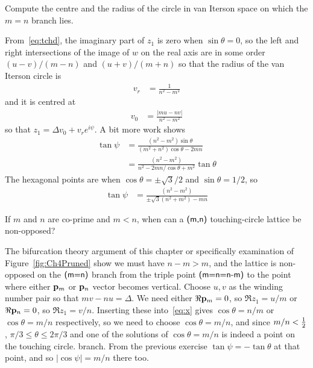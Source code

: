 \begin{jExercise}
		Compute the centre and the radius of the circle in van Iterson space on which the $m=n$ branch lies.
\end{jExercise}

\begin{jAnswer}
		From~\eqref{eq:tchd}, the imaginary part of $z_1$ is zero when  $\sin\theta=0$, so the left and right intersections of the image of $w$ on the real axis are in some order $(u-v)/(m-n)$ and $(u+v)/(m+n)$ so that the radius of the van Iterson circle
		is
\begin{align}	
			v_r &= \frac{1}{n^2-m^2}
\end{align}
and it is centred at
\begin{align}			v_0 &= \frac{|m u - n v|}{n^2-m^2}
\end{align}	so that $z_1=\Delta v_0 + v_r e^{i\psi}$. 
A bit more work shows
\begin{align}
	\tan \psi &= \frac{ (n^2-m^2)\sin \theta}{(m^2+n^2)\cos\theta-2mn}
	\\
	&= \frac{ (n^2-m^2)}{n^2-2mn/\cos\theta+m^2}\tan\theta
\end{align}
The hexagonal points are when $\cos\theta=\pm\sqrt{3}/2$ and $\sin\theta=1/2$, so
\begin{align}
	\tan \psi 
	&= \frac{ (n^2-m^2)}{\pm\sqrt{3}(n^2+m^2)-mn }
\end{align}

	\end{jAnswer}
	
	\begin{jExercise}
		If $m$ and $n$ are co-prime and $m<n$, when can a $\textsf{(m,n)}$ touching-circle lattice be non-opposed?
	\end{jExercise}
	\begin{jAnswer}
		The bifurcation theory argument of this chapter or specifically examination of Figure~\ref{fig:Ch4Pruned} show we must have $n-m>m$, 
		and the lattice is non-opposed  on the $\textsf{(m=n)}$ branch from the triple point $\textsf{(m=n=n-m)}$ to the point where either ${\mathbf p}_{m}$ or ${\mathbf p}_{n}$ vector becomes vertical.
			Choose $u,v$ as the winding number pair so that $m v - n u=\Delta$. We need either $\Re {\mathbf p}_{m}=0$, so $\Re z_1=u/m$ or $\Re {\mathbf p}_{n}=0$, so $\Re z_1=v/n$. Inserting these into~\ref{eq:x} gives $\cos\theta=n/m$ or $\cos\theta=m/n$ respectively, so we need to choose $\cos\theta=m/n$,
			and since $m/n<\textstyle{\frac{1}{2}}$, $\pi/3\leq\theta\leq 2\pi/3$ and one of the solutions of  $\cos\theta=m/n$ is indeed a point on the touching circle.
			 branch. From the previous exercise $\tan\psi=-\tan\theta$ at that point, 
			 and so $|\cos\psi|=m/n$ there too. 
	\end{jAnswer}
	
